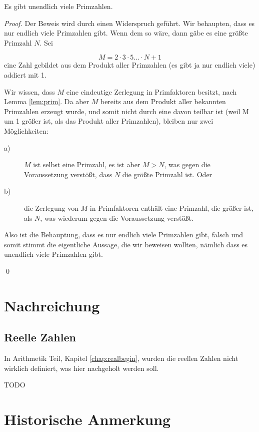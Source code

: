 \begin{theorem}
Es gibt unendlich viele Primzahlen.
\end{theorem}
\begin{proof}
Der Beweis wird durch einen Widerspruch geführt. Wir behaupten, dass es nur endlich viele Primzahlen gibt. Wenn dem so wäre, dann gäbe es eine größte Primzahl $N$. Sei

\[ M = 2\cdot 3\cdot 5\dots \cdot N +1 \]
eine Zahl gebildet aus dem Produkt aller Primzahlen (es gibt ja nur endlich viele) addiert mit 1.

Wir wissen, dass $M$ eine eindeutige Zerlegung in Primfaktoren besitzt, nach Lemma \ref{lem:prim}. Da aber $M$ bereits aus dem Produkt aller bekannten Primzahlen erzeugt wurde, und somit nicht durch eine davon teilbar ist (weil M um 1 größer ist, als das Produkt aller Primzahlen), bleiben nur zwei Möglichkeiten: 

\begin{description}
\item[a)] $M$ ist selbst eine Primzahl, es ist aber $M>N$, was gegen die Voraussetzung verstößt, dass $N$ die größte Primzahl ist. Oder
\item[b)] die Zerlegung von $M$ in Primfaktoren enthält eine Primzahl, die größer ist, als $N$, was wiederum gegen die Voraussetzung verstößt.
\end{description}

Also ist die Behauptung, dass es nur endlich viele Primzahlen gibt, falsch und somit stimmt die eigentliche Aussage, die wir beweisen wollten, nämlich dass es unendlich viele Primzahlen gibt. 

\qed
\end{proof}

\section{Nachreichung}

\subsection{Reelle Zahlen}\label{chap:realfinal}

In Arithmetik Teil, Kapitel \ref{chap:realbegin}, wurden die reellen Zahlen nicht wirklich definiert, was hier nachgeholt werden soll. 

TODO



\section{Historische Anmerkung}

